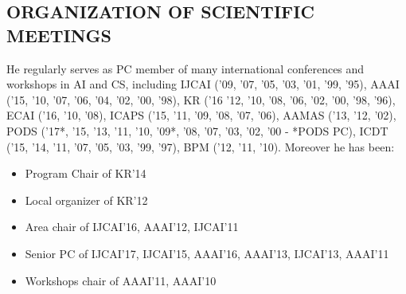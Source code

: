 \vspace{-1ex}
\subsection*{ORGANIZATION OF SCIENTIFIC MEETINGS}
\vspace{-1ex}
He regularly serves as PC member of many international conferences and workshops in AI and CS, including
IJCAI ('09, '07, '05, '03, '01, '99, '95), 
AAAI ('15, '10, '07, '06, '04, '02, '00, '98),
KR ('16 '12, '10, '08, '06, '02, '00, '98, '96), 
ECAI ('16, '10, '08), 
ICAPS ('15, '11, '09, '08, '07, '06), 
AAMAS ('13, '12, '02),
PODS ('17*, '15, '13, '11, '10, '09*, '08, '07, '03, '02, '00 - *PODS PC), 
ICDT ('15, '14, '11, '07, '05, '03, '99, '97),
BPM ('12, '11, '10).
Moreover he has been:
\begin{itemize}
\item Program Chair of KR'14
\item Local organizer of KR'12
\item Area chair of IJCAI'16, AAAI'12, IJCAI'11
\item Senior PC of IJCAI'17, IJCAI'15, AAAI'16, AAAI'13, IJCAI'13, AAAI'11
\item Workshops chair of AAAI'11, AAAI'10
\end{itemize}

